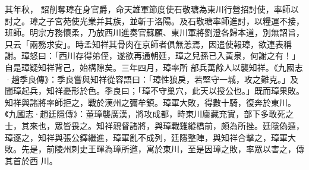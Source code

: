 \begin{pinyinscope}
 其年秋，
 詔削奪璋在身官爵，命天雄軍節度使石敬瑭為東川行營招討使，率師以討之。璋之子宮苑使光業并其族，並斬于洛陽。及石敬瑭率師進討，以糧運不接，班師。明宗方務懷柔，乃放西川進奏官蘇願、東川軍將劉澄各歸本道，別無詔旨，只云「兩務求安」。時孟知祥其骨肉在京師者俱無恙焉，因遣使報璋，欲連表稱謝。璋怒曰：「西川存得弟侄，遂欲再通朝廷，璋之兒孫已入黃泉，何謝之有！」自是璋疑知祥背己，始構隙矣。三年四月，璋率所
 部兵萬餘人以襲知祥。《九國志·趙季良傳》：季良嘗與知祥從容語曰：「璋性狼戾，若堅守一城，攻之難克。」及聞璋起兵，知祥憂形於色。季良曰；「璋不守巢穴，此天以授公也。」既而璋果敗。知祥與諸將率師拒之，戰於漢州之彌牟鎮。璋軍大敗，得數十騎，復奔於東川。《九國志·趙廷隱傳》：董璋襲廣漢，將攻成都，時東川廩藏充實，部下多敢死之士，其來也，眾皆畏之。知祥親督諸將，與璋戰雞縱橋前，頗為所挫。廷隱偽遁，璋逐之，知祥與張公鐸繼進，璋軍亂不成列，廷隱整陣，與知祥合擊之，璋軍大敗。先是，前陵州刺史王暉為璋所邀，寓於東川，至是因璋之敗，率眾以害之，傳其首於西
 川。



\end{pinyinscope}